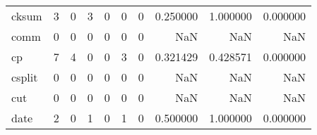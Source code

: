 \begin{longtable}{lrrrrrrrrr}
cksum     &                                                  3 &                                                  0 &                                                  3 &                                                  0 &                                                  0 &                                                  0 &                                           0.250000 &                               1.000000 &                             0.000000 \\
comm      &                                                  0 &                                                  0 &                                                  0 &                                                  0 &                                                  0 &                                                  0 &                                                NaN &                                    NaN &                                  NaN \\
cp        &                                                  7 &                                                  4 &                                                  0 &                                                  0 &                                                  3 &                                                  0 &                                           0.321429 &                               0.428571 &                             0.000000 \\
csplit    &                                                  0 &                                                  0 &                                                  0 &                                                  0 &                                                  0 &                                                  0 &                                                NaN &                                    NaN &                                  NaN \\
cut       &                                                  0 &                                                  0 &                                                  0 &                                                  0 &                                                  0 &                                                  0 &                                                NaN &                                    NaN &                                  NaN \\
date      &                                                  2 &                                                  0 &                                                  1 &                                                  0 &                                                  1 &                                                  0 &                                           0.500000 &                               1.000000 &                             0.000000 \\

\end{longtable}
